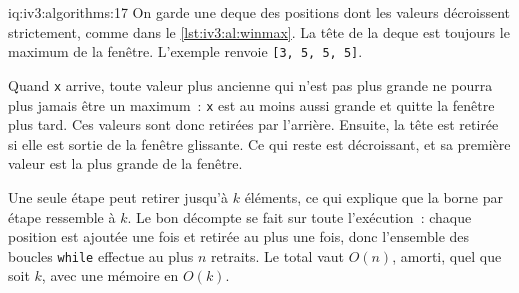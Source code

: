 \begin{solution}{iq:iv3:algorithms:17}
On garde une deque des positions dont les valeurs décroissent strictement, comme dans le \cref{lst:iv3:al:winmax}. La tête de la deque est toujours le maximum de la fenêtre. L'exemple renvoie \texttt{[3, 5, 5, 5]}.
\label{lst:iv3:al:winmax}

Quand \texttt{x} arrive, toute valeur plus ancienne qui n'est pas plus grande ne pourra plus jamais être un maximum~: \texttt{x} est au moins aussi grande et quitte la fenêtre plus tard. Ces valeurs sont donc retirées par l'arrière. Ensuite, la tête est retirée si elle est sortie de la fenêtre glissante. Ce qui reste est décroissant, et sa première valeur est la plus grande de la fenêtre.

Une seule étape peut retirer jusqu'à $k$ éléments, ce qui explique que la borne par étape ressemble à $k$. Le bon décompte se fait sur toute l'exécution~: chaque position est ajoutée une fois et retirée au plus une fois, donc l'ensemble des boucles \texttt{while} effectue au plus $n$ retraits. Le total vaut $O(n)$, amorti, quel que soit $k$, avec une mémoire en $O(k)$.

\end{solution}

